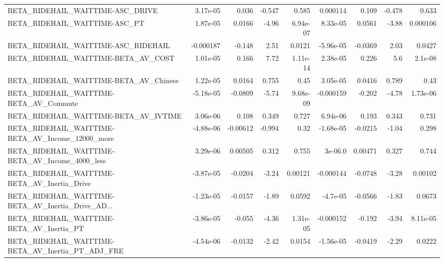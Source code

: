 \begin{tabular}{lrrrrrrrr}
BETA\_RIDEHAIL\_WAITTIME-ASC\_DRIVE                   &    3.17e-05 &        0.036 &   -0.547 &    0.585 &   0.000114 &       0.109 &       -0.478 &         0.633 \\
BETA\_RIDEHAIL\_WAITTIME-ASC\_PT                      &    1.87e-05 &       0.0166 &    -4.96 & 6.94e-07 &   8.33e-05 &      0.0561 &        -3.88 &      0.000106 \\
BETA\_RIDEHAIL\_WAITTIME-ASC\_RIDEHAIL                &   -0.000187 &       -0.148 &     2.51 &   0.0121 &  -5.96e-05 &     -0.0369 &         2.03 &        0.0427 \\
BETA\_RIDEHAIL\_WAITTIME-BETA\_AV\_COST                &    1.01e-05 &        0.166 &     7.72 & 1.11e-14 &   2.38e-05 &       0.226 &          5.6 &       2.1e-08 \\
BETA\_RIDEHAIL\_WAITTIME-BETA\_AV\_Chinese             &    1.22e-05 &       0.0164 &    0.755 &     0.45 &   3.05e-05 &      0.0416 &        0.789 &          0.43 \\
BETA\_RIDEHAIL\_WAITTIME-BETA\_AV\_Commute             &   -5.18e-05 &      -0.0809 &    -5.74 & 9.68e-09 &  -0.000159 &      -0.202 &        -4.78 &      1.73e-06 \\
BETA\_RIDEHAIL\_WAITTIME-BETA\_AV\_IVTIME              &    3.06e-06 &        0.108 &    0.349 &    0.727 &   6.94e-06 &       0.193 &        0.343 &         0.731 \\
BETA\_RIDEHAIL\_WAITTIME-BETA\_AV\_Income\_12000\_more   &   -4.88e-06 &     -0.00612 &   -0.994 &     0.32 &  -1.68e-05 &     -0.0215 &        -1.04 &         0.298 \\
BETA\_RIDEHAIL\_WAITTIME-BETA\_AV\_Income\_4000\_less    &    3.29e-06 &      0.00505 &    0.312 &    0.755 &    3e-06.0 &     0.00471 &        0.327 &         0.744 \\
BETA\_RIDEHAIL\_WAITTIME-BETA\_AV\_Inertia\_Drive       &   -3.87e-05 &      -0.0204 &    -3.24 &  0.00121 &  -0.000144 &     -0.0748 &        -3.28 &       0.00102 \\
BETA\_RIDEHAIL\_WAITTIME-BETA\_AV\_Inertia\_Drive\_AD... &   -1.23e-05 &      -0.0157 &    -1.89 &   0.0592 &   -4.7e-05 &     -0.0566 &        -1.83 &        0.0673 \\
BETA\_RIDEHAIL\_WAITTIME-BETA\_AV\_Inertia\_PT          &   -3.86e-05 &       -0.055 &    -4.36 & 1.31e-05 &  -0.000152 &      -0.192 &        -3.94 &      8.11e-05 \\
BETA\_RIDEHAIL\_WAITTIME-BETA\_AV\_Inertia\_PT\_ADJ\_FRE  &   -4.54e-06 &      -0.0132 &    -2.42 &   0.0154 &  -1.56e-05 &     -0.0419 &        -2.29 &        0.0222 \\

\end{tabular}
